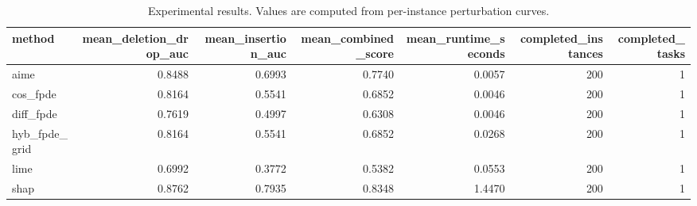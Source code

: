 \begin{table}[t]
\caption{Experimental results. Values are computed from per-instance perturbation curves.}
\label{tab:main_results_computed}
\centering
\begin{tabular}{lrrrrrr}
\toprule
method & mean\_deletion\_drop\_auc & mean\_insertion\_auc & mean\_combined\_score & mean\_runtime\_seconds & completed\_instances & completed\_tasks \\
\midrule
aime & 0.8488 & 0.6993 & 0.7740 & 0.0057 & 200 & 1 \\
cos\_fpde & 0.8164 & 0.5541 & 0.6852 & 0.0046 & 200 & 1 \\
diff\_fpde & 0.7619 & 0.4997 & 0.6308 & 0.0046 & 200 & 1 \\
hyb\_fpde\_grid & 0.8164 & 0.5541 & 0.6852 & 0.0268 & 200 & 1 \\
lime & 0.6992 & 0.3772 & 0.5382 & 0.0553 & 200 & 1 \\
shap & 0.8762 & 0.7935 & 0.8348 & 1.4470 & 200 & 1 \\
\bottomrule
\end{tabular}

\end{table}

